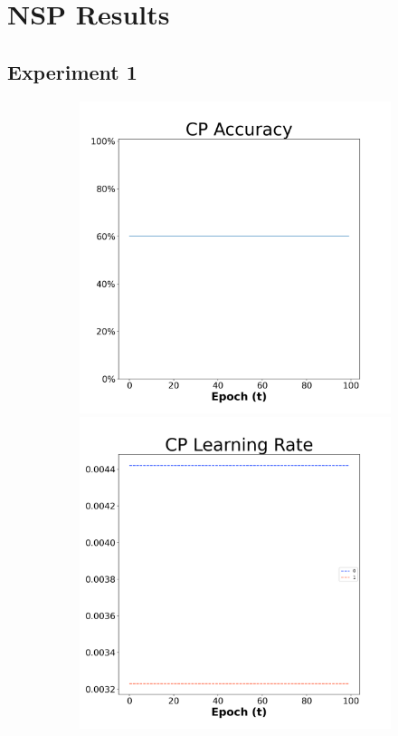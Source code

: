\section*{NSP Results}

\subsection*{Experiment 1}


\begin{figure}[H]
    \centering %
\begin{subfigure}{0.3\textwidth}
  \includegraphics[width=\linewidth]{images/exper1/NSP/CP_0.01_acc.png}
    \includegraphics[width=\linewidth]{images/exper1/NSP/CP_0.01_lr.png}

\end{subfigure}
\end{figure}
